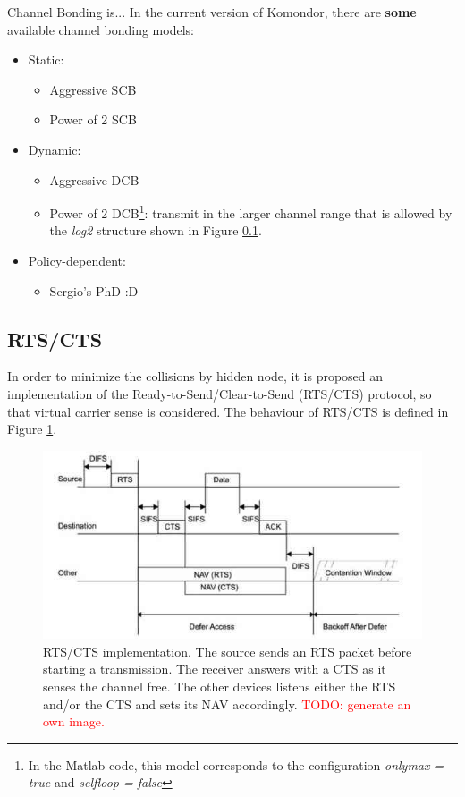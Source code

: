 \documentclass[a4paper]{article}
\begin{document}
Channel Bonding is...
In the current version of Komondor, there are \textbf{some} available channel bonding models:
\begin{itemize}
\item Static:
  \begin{itemize}
  \item Aggressive SCB
  \item Power of 2 SCB
  \end{itemize}
\item Dynamic:
  \begin{itemize}
  \item Aggressive DCB
  \item Power of 2 DCB\footnote{In the Matlab code, this model corresponds to the configuration \textit{onlymax = true} and \textit{selfloop = false}}: transmit in the larger channel range that is allowed by the \textit{log2} structure shown in Figure \ref{}.  
  \end{itemize}
 \item Policy-dependent:
  \begin{itemize}
  \item Sergio's PhD :D
  \end{itemize}
\end{itemize}

\subsection{RTS/CTS}
In order to minimize the collisions by hidden node, it is proposed an implementation of the Ready-to-Send/Clear-to-Send (RTS/CTS) protocol, so that virtual carrier sense is considered. The behaviour of RTS/CTS is defined in Figure \ref{fig:rts_cts_process}.
  
    \begin{figure}
	\centering
  \includegraphics[scale=0.7]{img/rts_cts.jpg}
  \caption{RTS/CTS implementation. The source sends an RTS packet before starting a transmission. The receiver answers with a CTS as it senses the channel free. The other devices listens either the RTS and/or the CTS and sets its NAV accordingly. \textcolor{red}{TODO: generate an own image.}}
  \label{fig:rts_cts_process}
\end{figure}
% 
% 
\end{document}
